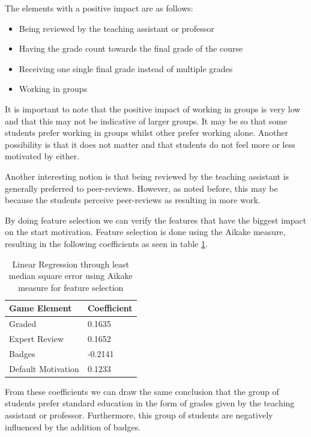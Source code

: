 \documentclass[11pt]{article}
\newcommand{\ra}[1]{\renewcommand{\arraystretch}{#1}}
\begin{document}
The elements with a positive impact are as follows:
\begin{itemize}
  \item Being reviewed by the teaching assistant or professor
  \item Having the grade count towards the final grade of the course
  \item Receiving one single final grade instead of multiple grades
  \item Working in groups
\end{itemize}


It is important to note that the positive impact of working in groups is very low and that this may not be indicative of larger groups. It may be so that some students prefer working in groups whilst other prefer working alone. Another possibility is that it does not matter and that students do not feel more or less motivated by either.

Another interesting notion is that being reviewed by the teaching assistant is generally preferred to peer-reviews. However, as noted before, this may be because the students perceive peer-reviews as resulting in more work.

By doing feature selection we can verify the features that have the biggest impact on the start motivation. Feature selection is done using the Aikake measure, resulting in the following coefficients as seen in table \ref{lmsreg_aikake}.

\begin{table}[h!t]\centering
\ra{1.3}
\begin{tabular}{@{}ll@{}}
\toprule
Game Element & Coefficient \\
\midrule
Graded 			& 0.1635 \\
Expert Review 		& 0.1652 \\
Badges 			& -0.2141 \\
Default Motivation	& 0.1233\\
\bottomrule
\end{tabular}
\caption{Linear Regression through least median square error using Aikake measure for feature selection}
\label{lmsreg_aikake}
\end{table}

From these coefficients we can draw the same conclusion that the group of students prefer standard education in the form of grades given by the teaching assistant or professor. Furthermore, this group of students are negatively influenced by the addition of badges.
\end{document}
